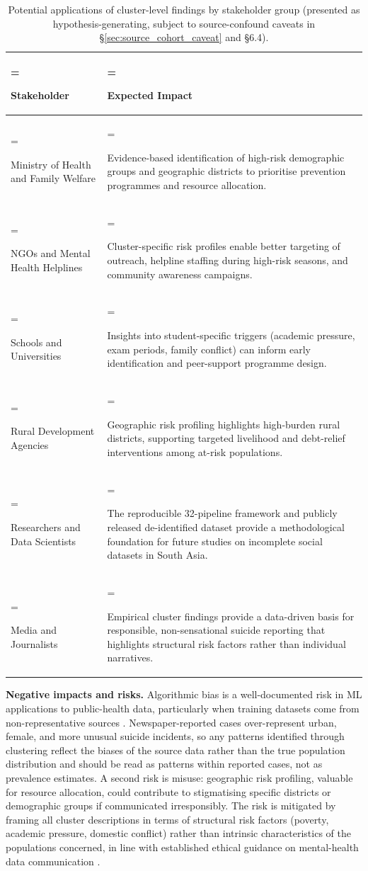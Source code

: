 \begin{table}[H]
\centering
\caption[Potential applications by stakeholder group]{Potential applications of cluster-level findings by stakeholder group (presented as hypothesis-generating, subject to source-confound caveats in \S\ref{sec:source_cohort_caveat} and \S6.4).}
\label{tbl:expected_societal_impacts_by_s}
\renewcommand{\arraystretch}{1.0}
\small
\begin{tabularx}{\textwidth}{|>{\hsize=0.611\hsize\linewidth=\hsize\raggedright\arraybackslash}X|>{\hsize=1.389\hsize\linewidth=\hsize\raggedright\arraybackslash}X|}
\hline
\textbf{Stakeholder} & \textbf{Expected Impact} \\ \hline
Ministry of Health and Family Welfare & Evidence-based identification of high-risk demographic groups and geographic districts to prioritise prevention programmes and resource allocation. \\ \hline
NGOs and Mental Health Helplines & Cluster-specific risk profiles enable better targeting of outreach, helpline staffing during high-risk seasons, and community awareness campaigns. \\ \hline
Schools and Universities & Insights into student-specific triggers (academic pressure, exam periods, family conflict) can inform early identification and peer-support programme design. \\ \hline
Rural Development Agencies & Geographic risk profiling highlights high-burden rural districts, supporting targeted livelihood and debt-relief interventions among at-risk populations. \\ \hline
Researchers and Data Scientists & The reproducible 32-pipeline framework and publicly released de-identified dataset provide a methodological foundation for future studies on incomplete social datasets in South Asia. \\ \hline
Media and Journalists & Empirical cluster findings provide a data-driven basis for responsible, non-sensational suicide reporting that highlights structural risk factors rather than individual narratives. \\ \hline
\end{tabularx}
\end{table}

\textbf{Negative impacts and risks.} Algorithmic bias is a well-documented risk in ML applications to public-health data, particularly when training datasets come from non-representative sources \cite{ref45,ref46}. Newspaper-reported cases over-represent urban, female, and more unusual suicide incidents, so any patterns identified through clustering reflect the biases of the source data rather than the true population distribution and should be read as patterns within reported cases, not as prevalence estimates. A second risk is misuse: geographic risk profiling, valuable for resource allocation, could contribute to stigmatising specific districts or demographic groups if communicated irresponsibly. The risk is mitigated by framing all cluster descriptions in terms of structural risk factors (poverty, academic pressure, domestic conflict) rather than intrinsic characteristics of the populations concerned, in line with established ethical guidance on mental-health data communication \cite{ref22}.

